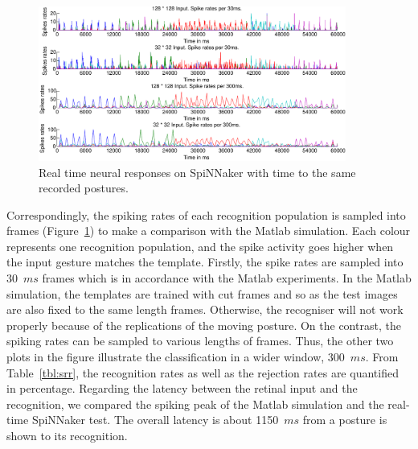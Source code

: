 \documentclass[journal]{journal}
\begin{document}
\begin{figure}
\centering
	\includegraphics[width=0.9\textwidth]{pics/spinrates1.pdf}
	\caption{Real time neural responses on SpiNNaker with time to the same recorded postures.}
	\label{fig:spikerec}
\end{figure}

Correspondingly, the spiking rates of each recognition population is sampled into frames (Figure~\ref{fig:spikerec}) to make a comparison with the Matlab simulation. 
Each colour represents one recognition population, and the spike activity goes higher when the input 
gesture matches the template. 
Firstly, the spike rates are sampled into 30~$ms$ frames which is in accordance with the Matlab experiments.
In the Matlab simulation, the templates are trained with cut frames and so as the test images are also fixed to the same length frames.
Otherwise, the recogniser will not work properly because of the replications of the moving posture.
On the contrast, the spiking rates can be sampled to various lengths of frames.
Thus, the other two plots in the figure illustrate the classification in a wider window, 300~$ms$.
From Table~\ref{tbl:srr}, the recognition rates as well as the rejection rates are quantified in percentage.
Regarding the latency between the retinal input and the recognition, we compared the spiking peak of the Matlab simulation and the real-time SpiNNaker test.
The overall latency is about 1150~$ms$ from a posture is shown to its recognition. 
\end{document}
